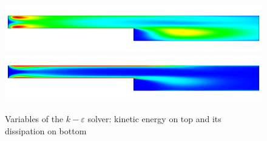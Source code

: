 \begin{figure}[h]
\centering
\includegraphics[width=15cm]{step_ke_kin}
\includegraphics[width=15cm]{step_ke_diss}
\caption{Variables of the $k-\varepsilon$ solver: kinetic energy on top and its dissipation on bottom}
\label{fg:step_ke}
\end{figure} 


\hfill
